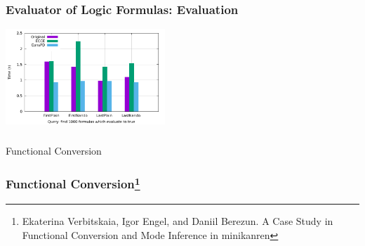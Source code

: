\documentclass[xcolor={dvipsnames}, aspectratio=169]{beamer}
\begin{document}
\begin{frame}[fragile]
  \frametitle{Evaluator of Logic Formulas: Evaluation}
\begin{table}[!h]
\label{tbl:eval}
\end{table}

\begin{center}
  \includegraphics[width=0.45\textwidth]{fig/prop/prop.pdf}
\end{center}
\end{frame}

\begin{frame}[fragile]
  \frametitle{}

\begin{center}
  \Large Functional Conversion
\end{center}

\end{frame}

\begin{frame}[fragile]
  \frametitle{Functional Conversion\footnote{Ekaterina Verbitskaia, Igor Engel, and Daniil Berezun. A Case Study in Functional Conversion and Mode Inference in minikanren}}



\end{frame}
\end{document}
